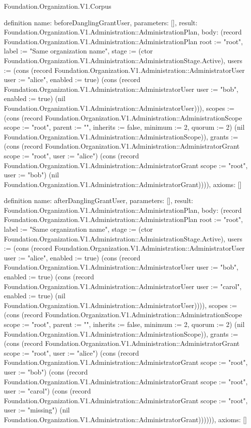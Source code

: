 \begin{lexlean}{Foundation.Organization.V1.Corpus}
\begin{semanticmodule}
definition{
  name: beforeDanglingGrantUser,
  parameters: [],
  result: Foundation.Organization.V1.Administration::AdministrationPlan,
  body: (record Foundation.Organization.V1.Administration::AdministrationPlan {root := "root", label := "Same organization name", stage := (ctor Foundation.Organization.V1.Administration::AdministrationStage.Active), users := (cons (record Foundation.Organization.V1.Administration::AdministratorUser {user := "alice", enabled := true}) (cons (record Foundation.Organization.V1.Administration::AdministratorUser {user := "bob", enabled := true}) (nil Foundation.Organization.V1.Administration::AdministratorUser))), scopes := (cons (record Foundation.Organization.V1.Administration::AdministrationScope {scope := "root", parent := "", inherits := false, minimum := 2, quorum := 2}) (nil Foundation.Organization.V1.Administration::AdministrationScope)), grants := (cons (record Foundation.Organization.V1.Administration::AdministratorGrant {scope := "root", user := "alice"}) (cons (record Foundation.Organization.V1.Administration::AdministratorGrant {scope := "root", user := "bob"}) (nil Foundation.Organization.V1.Administration::AdministratorGrant)))}),
  axioms: []
}

definition{
  name: afterDanglingGrantUser,
  parameters: [],
  result: Foundation.Organization.V1.Administration::AdministrationPlan,
  body: (record Foundation.Organization.V1.Administration::AdministrationPlan {root := "root", label := "Same organization name", stage := (ctor Foundation.Organization.V1.Administration::AdministrationStage.Active), users := (cons (record Foundation.Organization.V1.Administration::AdministratorUser {user := "alice", enabled := true}) (cons (record Foundation.Organization.V1.Administration::AdministratorUser {user := "bob", enabled := true}) (cons (record Foundation.Organization.V1.Administration::AdministratorUser {user := "carol", enabled := true}) (nil Foundation.Organization.V1.Administration::AdministratorUser)))), scopes := (cons (record Foundation.Organization.V1.Administration::AdministrationScope {scope := "root", parent := "", inherits := false, minimum := 2, quorum := 2}) (nil Foundation.Organization.V1.Administration::AdministrationScope)), grants := (cons (record Foundation.Organization.V1.Administration::AdministratorGrant {scope := "root", user := "alice"}) (cons (record Foundation.Organization.V1.Administration::AdministratorGrant {scope := "root", user := "bob"}) (cons (record Foundation.Organization.V1.Administration::AdministratorGrant {scope := "root", user := "carol"}) (cons (record Foundation.Organization.V1.Administration::AdministratorGrant {scope := "root", user := "missing"}) (nil Foundation.Organization.V1.Administration::AdministratorGrant)))))}),
  axioms: []
}


\end{semanticmodule}
\end{lexlean}
